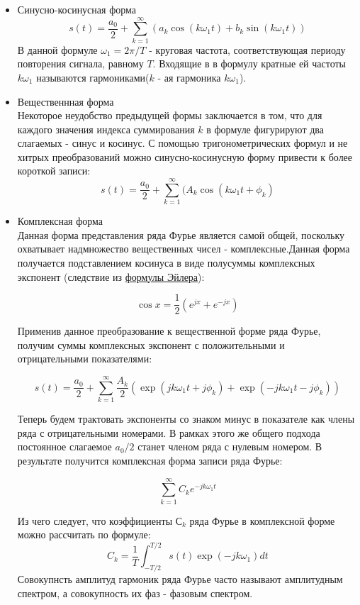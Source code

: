 \begin{itemize}
\item Синусно-косинусная форма \\
$$ s(t) = \frac{a_0}{2} +  \sum\limits_{k=1}^{\infty}(a_k \cos(k \omega_1 t) + b_k \sin(k \omega_1 t)) $$
В данной формуле $\omega_1 = 2 \pi / T$ - круговая частота, соответствующая периоду повторения сигнала, равному $T$. Входящие в в формулу кратные ей частоты $ k \omega_1 $
называются гармониками($ k $ - ая гармоника $ k \omega_1 $).
  
\item Вещественнная форма \\
Некоторое неудобство предыдущей формы заключается в том, что для каждого значения индекса суммирования $k$ в формуле фигурируют два слагаемых - синус и косинус. С помощью 
тригонометрических формул и не хитрых преобразований можно синусно-косинусную форму привести к более короткой записи:
$$s(t) = \frac{a_0}{2} +  \sum\limits_{k=1}^{\infty}(A_k \cos(k \omega_1 t + \phi_k ) $$
\item Комплексная форма \\
Данная форма представления ряда Фурье является самой общей, поскольку охватывает надмножество вещественных чисел - комплексные.Данная форма получается подставлением
косинуса в виде полусуммы комплексных экспонент (следствие из \href{https://ru.wikipedia.org/wiki/%D0%A4%D0%BE%D1%80%D0%BC%D1%83%D0%BB%D0%B0_%D0%AD%D0%B9%D0%BB%D0%B5%D1%80%D0%B0}{формулы Эйлера}):

$$ \cos x = \frac{1}{2}(e^{jx} + e^{-jx}) $$ 

Применив данное преобразование к вещественной форме ряда Фурье, получим суммы комплексных экспонент с положительными и отрицательными показателями:

$$ s(t) = \frac{a_0}{2} +  \sum\limits_{k=1}^{\infty} \frac{A_k}{2} 
(\exp(jk \omega_1 t + j \phi_k) + \exp(-jk \omega_1 t - j \phi_k)) $$

Теперь будем трактовать экспоненты со знаком минус в показателе как члены ряда с отрицательными номерами. В рамках этого же общего подхода постоянное слагаемое $ a_0 / 2$ станет членом ряда с нулевым номером. В результате получится комплексная форма записи ряда Фурье:

$$  \sum\limits_{k=1}^{\infty}C_k e^{-jk \omega_1t} $$ 

Из чего следует, что коэффициенты $ С_k $ ряда Фурье в комплексной форме можно рассчитать по формуле:
$$ C_k = \frac{1}{T}  \int_{-T/2}^{T/2} s(t) \exp(-jk \omega_1) dt $$
Совокупнсть амплитуд гармоник ряда Фурье часто называют амплитудным спектром, а совокупность их фаз - фазовым спектром.  


\end{itemize}
